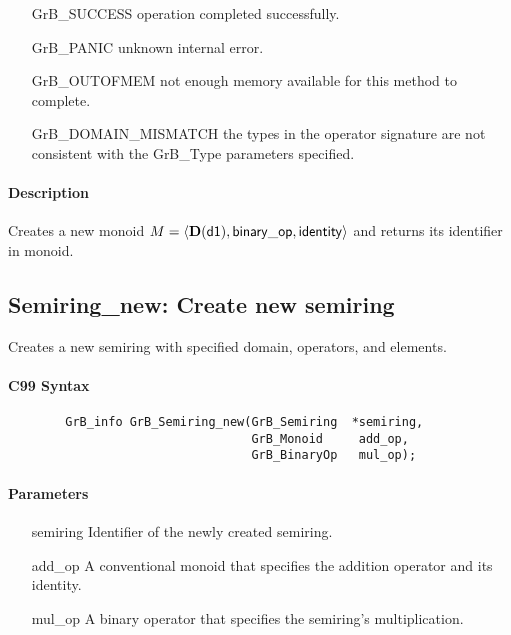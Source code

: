 \begin{itemize}[leftmargin=2.1in]
\item[{\sf GrB\_SUCCESS}]           operation completed successfully.
\item[{\sf GrB\_PANIC}]             unknown internal error.
\item[{\sf GrB\_OUTOFMEM}]          not enough memory available for this method to complete.
\item[{\sf GrB\_DOMAIN\_MISMATCH}]  the types in the operator signature are not   
                                    consistent with the {\sf GrB\_Type} parameters specified.
\end{itemize}

\paragraph{Description}

Creates a new monoid $M = \langle \bold{D}({\sf d1}), 
{\sf binary\_op}, {\sf identity} \rangle$ and
returns its identifier in {\sf monoid}.


\subsection{{\sf Semiring\_new}: Create new semiring}

Creates a new semiring with specified domain, operators, and elements.

\paragraph{C99 Syntax}

\begin{verbatim}
        GrB_info GrB_Semiring_new(GrB_Semiring  *semiring,
                                  GrB_Monoid     add_op,
                                  GrB_BinaryOp   mul_op);
\end{verbatim}

\paragraph{Parameters}

\begin{itemize}[leftmargin=1.1in]
    \item[{\sf semiring}]       Identifier of the newly created semiring.
    \item[{\sf add\_op}]        A conventional monoid that specifies the addition operator and its identity.
    \item[{\sf mul\_op}]        A binary operator that specifies the semiring's multiplication.
\end{itemize}


